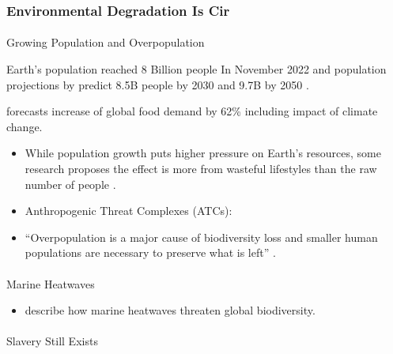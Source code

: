 \documentclass[
  letterpaper,
  DIV=11,
  numbers=noendperiod]{scrartcl}
\makeatletter
\let\oldparagraph\paragraph
\renewcommand{\paragraph}{
    \@ifstar
      \xxxParagraphStar
      \xxxParagraphNoStar
  }
\newcommand{\xxxParagraphStar}[1]{\oldparagraph*{#1}\mbox{}}
\newcommand{\xxxParagraphNoStar}[1]{\oldparagraph{#1}\mbox{}}
\providecommand{\tightlist}{%
  \setlength{\itemsep}{0pt}\setlength{\parskip}{0pt}}\usepackage{longtable,booktabs,array}
\makeatother
\begin{document}
\subsubsection{\texorpdfstring{\textbf{Environmental Degradation Is
Cir}}{Environmental Degradation Is Cir}}\label{environmental-degradation-is-cir}

\paragraph{Growing Population and
Overpopulation}\label{growing-population-and-overpopulation}

Earth's population reached 8 Billion people In November 2022 and
population projections by predict 8.5B people by 2030 and 9.7B by 2050
\citep{theeconomictimesClimateChangeEarth2022, unWorldPopulationProspects2022}.

\citep{hassounFoodProcessingCurrent2023} forecasts increase of global
food demand by 62\% including impact of climate change.

\begin{itemize}
\item
  While population growth puts higher pressure on Earth's resources,
  some research proposes the effect is more from wasteful lifestyles
  than the raw number of people
  \citep{cardinaleBiodiversityLossIts2012}.
\item
  \citet{bowlerMappingHumanPressures2020} Anthropogenic Threat Complexes
  (ATCs):
\item
  ``Overpopulation is a major cause of biodiversity loss and smaller
  human populations are necessary to preserve what is left''
  \citet{cafaroOverpopulationMajorCause2022}.
\end{itemize}

\paragraph{Marine Heatwaves}\label{marine-heatwaves}

\begin{itemize}
\tightlist
\item
  \citep[ and
  \citet{gellesOceanDireMessage2023}]{smaleMarineHeatwavesThreaten2019}
  describe how marine heatwaves threaten global biodiversity.
\end{itemize}

\paragraph{Slavery Still Exists}\label{slavery-still-exists}
\end{document}
